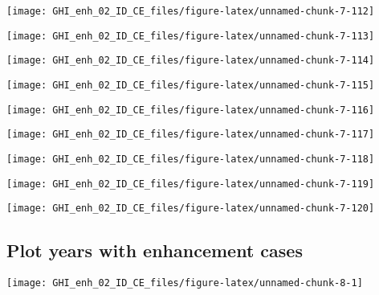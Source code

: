 \documentclass[
  10pt,
  a4paper,oneside]{article}
\begin{document}
\begin{center}\texttt{[image: GHI\_enh\_02\_ID\_CE\_files/figure-latex/unnamed-chunk-7-112]} \end{center}

\begin{center}\texttt{[image: GHI\_enh\_02\_ID\_CE\_files/figure-latex/unnamed-chunk-7-113]} \end{center}

\begin{center}\texttt{[image: GHI\_enh\_02\_ID\_CE\_files/figure-latex/unnamed-chunk-7-114]} \end{center}

\begin{center}\texttt{[image: GHI\_enh\_02\_ID\_CE\_files/figure-latex/unnamed-chunk-7-115]} \end{center}

\begin{center}\texttt{[image: GHI\_enh\_02\_ID\_CE\_files/figure-latex/unnamed-chunk-7-116]} \end{center}

\begin{center}\texttt{[image: GHI\_enh\_02\_ID\_CE\_files/figure-latex/unnamed-chunk-7-117]} \end{center}

\begin{center}\texttt{[image: GHI\_enh\_02\_ID\_CE\_files/figure-latex/unnamed-chunk-7-118]} \end{center}

\begin{center}\texttt{[image: GHI\_enh\_02\_ID\_CE\_files/figure-latex/unnamed-chunk-7-119]} \end{center}

\begin{center}\texttt{[image: GHI\_enh\_02\_ID\_CE\_files/figure-latex/unnamed-chunk-7-120]} \end{center}

\hypertarget{plot-years-with-enhancement-cases}{%
\subsection{Plot years with enhancement cases}\label{plot-years-with-enhancement-cases}}

\begin{center}\texttt{[image: GHI\_enh\_02\_ID\_CE\_files/figure-latex/unnamed-chunk-8-1]} \end{center}
\end{document}
